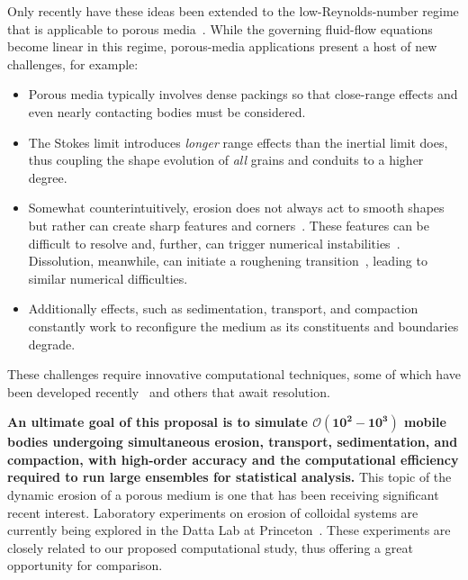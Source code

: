 \documentclass[11pt]{article}
\begin{document}
Only recently have these ideas been extended to the low-Reynolds-number regime that is applicable to porous media~\cite{mitchell2017generalized, Quaife2018}. While the governing fluid-flow equations become linear in this regime, porous-media applications present a host of new challenges, for example:
\begin{itemize}[noitemsep,topsep=0pt]
\item Porous media typically involves dense packings so that close-range effects and even nearly contacting bodies must be considered.

\item The Stokes limit introduces {\em longer} range effects than the inertial limit does, thus coupling the shape evolution of {\em all} grains and conduits to a higher degree.

\item Somewhat counterintuitively, erosion does not always act to smooth shapes but rather can create sharp features and corners~\cite{Ristroph2012}. These features can be difficult to resolve and, further, can trigger numerical instabilities~\cite{Quaife2018}. Dissolution, meanwhile, can initiate a roughening transition~\cite{claudin2017dissolution}, leading to similar numerical difficulties.

\item Additionally effects, such as sedimentation, transport, and compaction constantly work to reconfigure the medium as its constituents and boundaries degrade.
\end{itemize}
These challenges require innovative computational techniques, some of which have been developed recently~\cite{Quaife2018} and others that await resolution. 

{\bf An ultimate goal of this proposal is to simulate $\boldsymbol{\mathcal{O}(10^2-10^3)}$ mobile bodies undergoing simultaneous erosion, transport, sedimentation, and compaction, with high-order accuracy and the computational efficiency required to run large ensembles for statistical analysis.} 
This topic of the dynamic erosion of a porous medium is one that has been receiving significant recent interest. Laboratory experiments on erosion of colloidal systems are currently being explored in the Datta Lab at Princeton~\cite{bizmark2019multiscale}. These experiments are closely related to our proposed computational study, thus offering a great opportunity for comparison.
\end{document}
